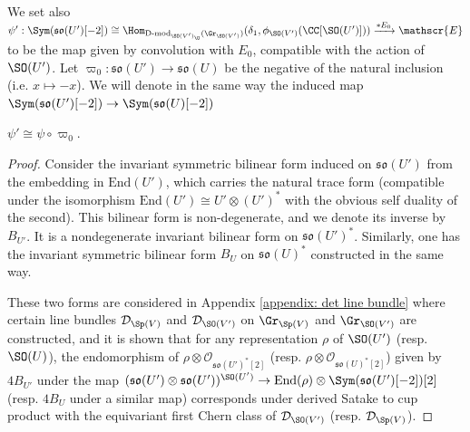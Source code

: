\documentclass[11pt]{article}
\begin{document}
We set also $\psi':\Sym(\mathfrak{so}(U')[-2])\cong \Hom_{\operatorname{D-mod}_{\SO(V')_\O}(\Gr_{\SO(V')})}(\delta_1, \phi_{\SO(V')}(\CC[\SO(U')]))\xrightarrow{*E_0} \mathscr{E}$ to be the map given by convolution with $E_0$, compatible with the action of $\SO(U')$.
Let $\varpi_0:\mathfrak{so}(U')\to \mathfrak{so}(U)$ be the negative of the natural inclusion (i.e. $x\mapsto -x$). We will denote in the same way the induced map $\Sym(\mathfrak{so}(U')[-2])\to \Sym(\mathfrak{so}(U)[-2])$
\begin{proposition}\label{prop: psi psi' identification}
    $\psi'\cong\psi\circ \varpi_0$.
\end{proposition}
\begin{proof}
    Consider the invariant symmetric bilinear form induced on $\mathfrak{so}(U')$ from the embedding in $\mathrm{End}(U')$, which carries the natural trace form (compatible under the isomorphism $\mathrm{End}(U')\cong U'\otimes (U')^*$ with the obvious self duality of the second). This bilinear form is non-degenerate, and we denote its inverse by $B_{U'}$. It is a nondegenerate invariant bilinear form on $\mathfrak{so}(U')^*$.
    Similarly, one has the invariant symmetric bilinear form $B_U$ on $\mathfrak{so}(U)^*$ constructed in the same way.
    
    These two forms are considered in Appendix \ref{appendix: det line bundle} where certain line bundles $\mathcal{D}_{\Sp(V)}$ and $\mathcal{D}_{\SO(V')}$ on $\Gr_{\Sp(V)}$ and $\Gr_{\SO(V')}$ are constructed, and it is shown that for any representation $\rho$ of $\SO(U')$ (resp. $\SO(U)$), the endomorphism of $\rho\otimes \mathcal{O}_{\mathfrak{so}(U')^*[2]}$ (resp. $\rho\otimes \mathcal{O}_{\mathfrak{so}(U)^*[2]}$) given by $4B_{U'}$ under the map $(\mathfrak{so}(U')\otimes \mathfrak{so}(U'))^{\SO(U')}\to \mathrm{End}(\rho)\otimes \Sym(\mathfrak{so}(U')[-2]) [2]$ (resp. $4B_U$ under a similar map) corresponds under derived Satake to cup product with the equivariant first Chern class of $\mathcal{D}_{\SO(V')}$ (resp. $\mathcal{D}_{\Sp(V)}$).
    

\end{proof}
\end{document}
